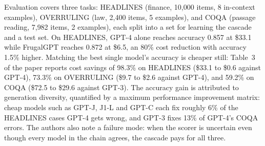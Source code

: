 Evaluation covers three tasks: HEADLINES (finance, 10{,}000 items, 8 in-context examples), OVERRULING (law, 2{,}400 items, 5 examples), and COQA (passage reading, 7{,}982 items, 2 examples), each split into a set for learning the cascade and a test set. On HEADLINES, GPT-4 alone reaches accuracy 0.857 at \$33.1 while FrugalGPT reaches 0.872 at \$6.5, an 80\% cost reduction with accuracy 1.5\% higher. Matching the best single model's accuracy is cheaper still: Table~3 of the paper reports cost savings of 98.3\% on HEADLINES (\$33.1 to \$0.6 against GPT-4), 73.3\% on OVERRULING (\$9.7 to \$2.6 against GPT-4), and 59.2\% on COQA (\$72.5 to \$29.6 against GPT-3). The accuracy gain is attributed to generation diversity, quantified by a maximum performance improvement matrix: cheap models such as GPT-J, J1-L and GPT-C each fix roughly 6\% of the HEADLINES cases GPT-4 gets wrong, and GPT-3 fixes 13\% of GPT-4's COQA errors. The authors also note a failure mode: when the scorer is uncertain even though every model in the chain agrees, the cascade pays for all three.


